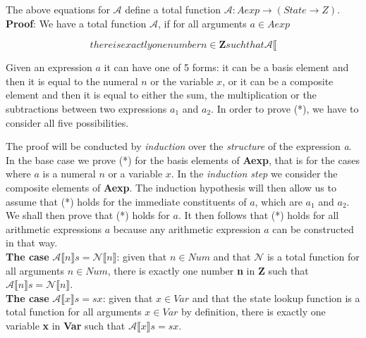 \documentclass{article}
\begin{document}

The above equations for $\mathcal{A}$ define a total function $\mathcal{A}: Aexp \rightarrow (State \rightarrow Z)$. \\

\noindent \textbf{Proof}: We have a total function $\mathcal A$, if for all arguments $a \in Aexp$

\begin{equation}
  \tag{*}
  there is exactly one number n \in \textbf{Z} such that \mathcal{A} \llbracket 
  \label{eqn:Stokes}
\end{equation}

Given an expression $a$ it can have one of 5 forms: it can be a basis element and then it is equal to the numeral $n$ or the variable $x$, or it can be a composite element and then it is equal to either the sum, the multiplication or the subtractions between two expressions $a_1$ and $a_2$. In order to prove (*), we have to consider all five possibilities.

The proof will be conducted by \textit{induction} over the \textit{structure} of the expression \textit{a}. In the base case we prove (*) for the basis elements of \textbf{Aexp},
that is for the cases where $a$ is a numeral $n$ or a variable $x$. In the \textit{induction step} we consider the composite elements of \textbf{Aexp}.
The induction hypothesis will then allow us to assume that (*) holds for the immediate constituents of $a$, which are $a_1$ and $a_2$. We shall then prove that (*) holds for $a$.
It then follows that (*) holds for all arithmetic expressions $a$ because any arithmetic expression $a$ can be constructed in that way. \\

\noindent \textbf{The case} $\mathcal{A}\llbracket n \rrbracket s = \mathcal{N} \llbracket n \rrbracket$: given that $n \in Num$ and that $\mathcal{N}$ is a total function for all arguments $n \in Num$, there is exactly one number \textbf{n} in \textbf{Z}
such that $\mathcal{A}\llbracket n \rrbracket s = \mathcal{N} \llbracket n \rrbracket$. \\

\noindent \textbf{The case} $\mathcal{A}\llbracket x \rrbracket s = s x$: given that $x \in Var$ and that the state lookup function is a total function for all arguments $x \in Var$ by definition, there is exactly one variable \textbf{x} in \textbf{Var}
such that $\mathcal{A}\llbracket x \rrbracket s = s x$. \\
\end{document}
